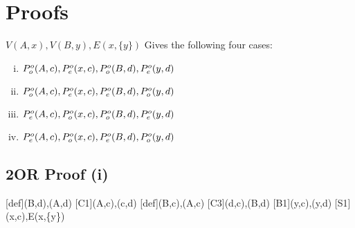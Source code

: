 \section{Proofs}
\label{sec:Proof}
$V(A,x),V(B,y),E(x,\{y\})$ Gives the following four cases:
\begin{enumerate}[(i)]
  \item $P^o_o(A,c), P^o_e(x,c), P^o_o(B,d), P^o_e(y,d)$
  \item $P^o_o(A,c), P^o_e(x,c), P^o_e(B,d), P^o_o(y,d)$
  \item $P^o_e(A,c), P^o_o(x,c), P^o_o(B,d), P^o_e(y,d)$
  \item $P^o_e(A,c), P^o_o(x,c), P^o_e(B,d), P^o_o(y,d)$
\end{enumerate}
\subsection{2OR Proof (i)}
\label{sub:2OR Proof (i)}

\begin{prooftree*}[downwards]
  [def]{\poe(B,d),\poo(A,d)}
  [C1]{\poo(A,c),\pee(c,d)}
  [def]{\poe(B,c),\poo(A,c)}
  [C3]{\poe(d,c),\poe(B,d)}
  [B1]{\peo(y,c),\poo(y,d)}
  [S1]{\poo(x,c),E(x,\{y\})}
\end{prooftree*}
